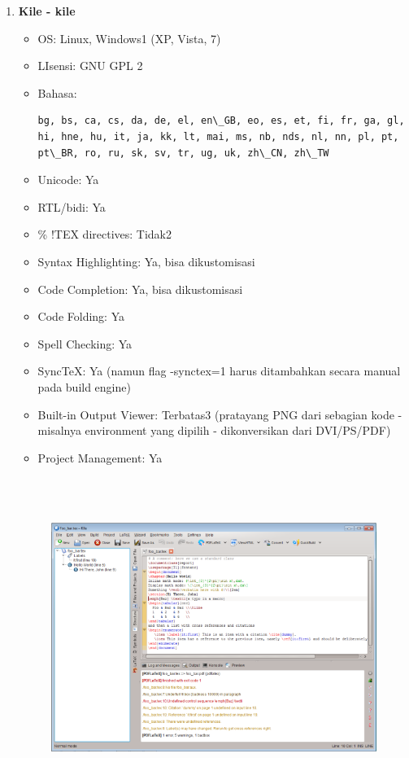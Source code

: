 \begin{enumerate}
\item \textbf{Kile - kile}
\begin{itemize}
\item OS: Linux, Windows1 (XP, Vista, 7)
\item LIsensi: GNU GPL 2
\item Bahasa:
\begin{verbatim}bg, bs, ca, cs, da, de, el, en\_GB, eo, es, et, fi, fr, ga, gl, hi, hne, hu, it, ja, kk, lt, mai, ms, nb, nds, nl, nn, pl, pt, pt\_BR, ro, ru, sk, sv, tr, ug, uk, zh\_CN, zh\_TW
\end{verbatim}
\item Unicode: Ya
\item RTL/bidi: Ya
\item \% !TEX directives: Tidak2
\item Syntax Highlighting: Ya, bisa dikustomisasi
\item Code Completion: Ya, bisa dikustomisasi
\item Code Folding: Ya
\item Spell Checking: Ya
\item SyncTeX: Ya (namun flag -synctex=1 harus ditambahkan secara manual pada build engine)
\item Built-in Output Viewer: Terbatas3 (pratayang PNG dari sebagian kode - misalnya environment yang dipilih - dikonversikan dari DVI/PS/PDF)
\item Project Management: Ya
\end{itemize}
\begin{figure}[ht]

\includegraphics[width=14.76cm,height=10.39cm]{gambar/image6.jpg}
\end{figure}



\end{enumerate}
